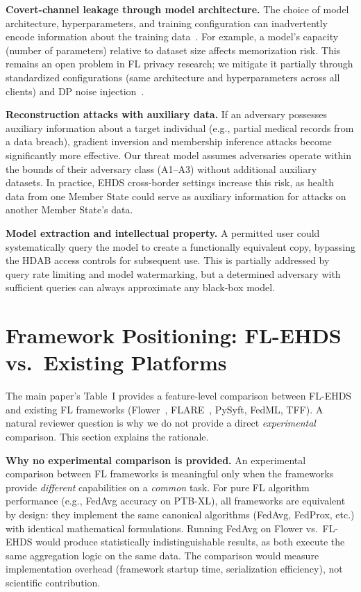 \documentclass[conference,a4paper]{IEEEtran}
\begin{document}
\textbf{Covert-channel leakage through model architecture.} The choice of model architecture, hyperparameters, and training configuration can inadvertently encode information about the training data~\cite{carlini2022privacy}. For example, a model's capacity (number of parameters) relative to dataset size affects memorization risk. This remains an open problem in FL privacy research; we mitigate it partially through standardized configurations (same architecture and hyperparameters across all clients) and DP noise injection~\cite{carlini2022privacy}.

\textbf{Reconstruction attacks with auxiliary data.} If an adversary possesses auxiliary information about a target individual (e.g., partial medical records from a data breach), gradient inversion and membership inference attacks become significantly more effective. Our threat model assumes adversaries operate within the bounds of their adversary class (A1--A3) without additional auxiliary datasets. In practice, EHDS cross-border settings increase this risk, as health data from one Member State could serve as auxiliary information for attacks on another Member State's data.

\textbf{Model extraction and intellectual property.} A permitted user could systematically query the model to create a functionally equivalent copy, bypassing the HDAB access controls for subsequent use. This is partially addressed by query rate limiting and model watermarking, but a determined adversary with sufficient queries can always approximate any black-box model.

\section{Framework Positioning: FL-EHDS vs.\ Existing Platforms}
\label{sec:framework_comparison}

The main paper's Table~I provides a feature-level comparison between FL-EHDS and existing FL frameworks (Flower~\cite{beutel2023flower}, FLARE~\cite{nvflare2023}, PySyft, FedML, TFF). A natural reviewer question is why we do not provide a direct \textit{experimental} comparison. This section explains the rationale.

\textbf{Why no experimental comparison is provided.} An experimental comparison between FL frameworks is meaningful only when the frameworks provide \textit{different} capabilities on a \textit{common} task. For pure FL algorithm performance (e.g., FedAvg accuracy on PTB-XL), all frameworks are equivalent by design: they implement the same canonical algorithms (FedAvg, FedProx, etc.) with identical mathematical formulations. Running FedAvg on Flower vs.\ FL-EHDS would produce statistically indistinguishable results, as both execute the same aggregation logic on the same data. The comparison would measure implementation overhead (framework startup time, serialization efficiency), not scientific contribution.
\end{document}
